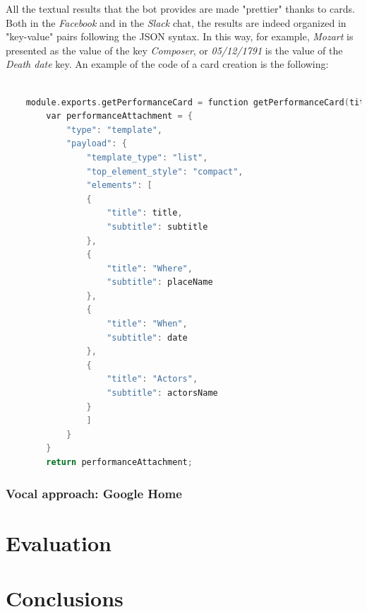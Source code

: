 \documentclass[a4paper,12pt]{report}
\begin{document}
	All the textual results that the bot provides are made "prettier" thanks to cards. Both in the \textit{Facebook} and in the \textit{Slack} chat, the results are indeed organized in "key-value" pairs following the JSON syntax. In this way, for example, \textit{Mozart} is presented as the value of the key \textit{Composer}, or \textit{05/12/1791} is the value of the \textit{Death date} key. An example of the code of a card creation is the following:
	\begin{lstlisting}[language=C]
	
	module.exports.getPerformanceCard = function getPerformanceCard(title, subtitle, placeName, actorsName, date) {  
		var performanceAttachment = {
			"type": "template",
			"payload": {
				"template_type": "list",
				"top_element_style": "compact",
				"elements": [
				{
					"title": title,
					"subtitle": subtitle
				},
				{
					"title": "Where",
					"subtitle": placeName
				},
				{
					"title": "When",
					"subtitle": date        
				},
				{
					"title": "Actors",
					"subtitle": actorsName        
				}
				] 
			}
		}
		return performanceAttachment;
	\end{lstlisting}
	
	\subsection{Vocal approach: Google Home}
	
	\chapter{Evaluation}
	
	\chapter{Conclusions}
	
\end{document}
